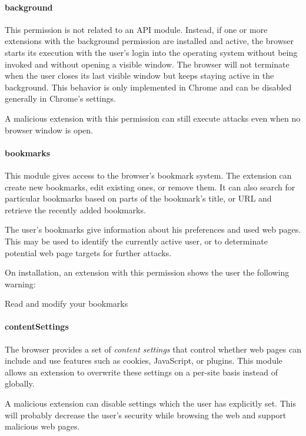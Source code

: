 \paragraph{background}
	This permission is not related to an API module. Instead, if one or more extensions with the background permission are installed and active, the browser starts its execution with the user's login into the operating system without being invoked and without opening a visible window. The browser will not terminate when the user closes its last visible window but keeps staying active in the background. This behavior is only implemented in Chrome and can be disabled generally in Chrome's settings.
	
	A malicious extension with this permission can still execute attacks even when no browser window is open.
	
\paragraph{bookmarks} 
	This module gives access to the browser's bookmark system. The extension can create new bookmarks, edit existing ones, or remove them. It can also search for particular bookmarks based on parts of the bookmark's title, or URL and retrieve the recently added bookmarks.
	
	The user's bookmarks give information about his preferences and used web pages. This may be used to identify the currently active user, or to determinate potential web page targets for further attacks.
	
	On installation, an extension with this permission shows the user the following warning:
	\begin{permissionwarning}
		Read and modify your bookmarks
	\end{permissionwarning}
	
\paragraph{contentSettings} 
	The browser provides a set of \textit{content settings} that control whether web pages can include and use features such as cookies, JavaScript, or plugins. This module  allows an extension to overwrite these settings on a per-site basis instead of globally.
	
	A malicious extension can disable settings which the user has explicitly set. This will probably decrease the user's security while browsing the web and support malicious web pages.
	
